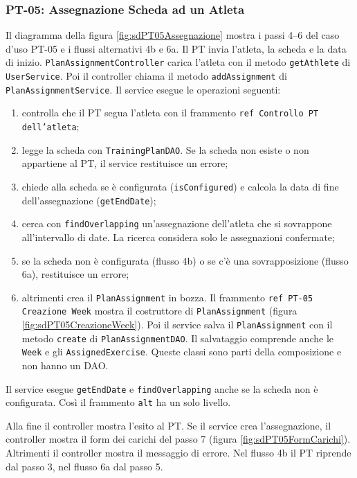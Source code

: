 \subsubsection{PT-05: Assegnazione Scheda ad un Atleta}
Il diagramma della figura \ref{fig:sdPT05Assegnazione} mostra i passi
4--6 del caso d'uso PT-05 e i flussi alternativi 4b e 6a. Il PT invia
l'atleta, la scheda e la data di inizio.
\texttt{PlanAssignmentController} carica l'atleta con il metodo
\texttt{getAthlete} di \texttt{UserService}. Poi il controller chiama
il metodo \texttt{addAssignment} di \texttt{PlanAssignmentService}. Il
service esegue le operazioni seguenti:
\begin{enumerate}
  \item controlla che il PT segua l'atleta con il frammento
    \texttt{ref Controllo PT dell'atleta};
  \item legge la scheda con \texttt{TrainingPlanDAO}. Se la scheda non
    esiste o non appartiene al PT, il service restituisce un errore;
  \item chiede alla scheda se è configurata (\texttt{isConfigured}) e
    calcola la data di fine dell'assegnazione (\texttt{getEndDate});
  \item cerca con \texttt{findOverlapping} un'assegnazione dell'atleta
    che si sovrappone all'intervallo di date. La ricerca considera
    solo le assegnazioni confermate;
  \item se la scheda non è configurata (flusso 4b) o se c'è una
    sovrapposizione (flusso 6a), restituisce un errore;
  \item altrimenti crea il \texttt{PlanAssignment} in bozza. Il
    frammento \texttt{ref PT-05 Creazione Week} mostra il costruttore
    di \texttt{PlanAssignment} (figura \ref{fig:sdPT05CreazioneWeek}).
    Poi il service salva il \texttt{PlanAssignment} con il metodo
    \texttt{create} di \texttt{PlanAssignmentDAO}. Il
    salvataggio comprende anche le \texttt{Week} e gli
    \texttt{AssignedExercise}. Queste classi sono parti della
    composizione e non hanno un DAO.
\end{enumerate}
Il service esegue \texttt{getEndDate} e \texttt{findOverlapping} anche
se la scheda non è configurata. Così il frammento \texttt{alt} ha un
solo livello.

Alla fine il controller mostra l'esito al PT. Se il service crea
l'assegnazione, il controller mostra il form dei carichi del passo 7
(figura \ref{fig:sdPT05FormCarichi}). Altrimenti il controller mostra il messaggio di errore. Nel flusso 4b
il PT riprende dal passo 3, nel flusso 6a dal passo 5.

